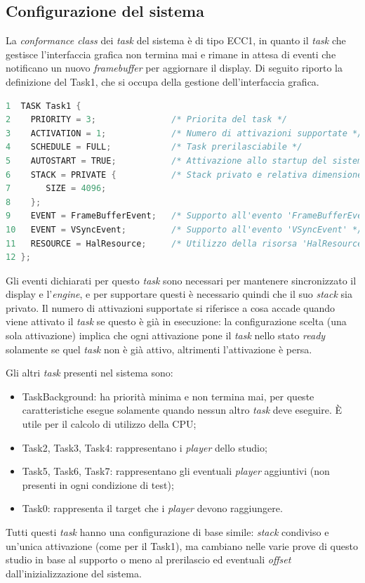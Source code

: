 \documentclass{article}
\begin{document}
\subsection{Configurazione del sistema}
La \textit{conformance class} dei \textit{task} del sistema è di tipo ECC1, in quanto il \textit{task} che gestisce l'interfaccia grafica non termina mai e rimane in attesa di eventi che notificano un nuovo \textit{framebuffer} per aggiornare il display.
Di seguito riporto la definizione del Task1, che si occupa della gestione dell'interfaccia grafica.
\begin{lstlisting}[language=C]
1  TASK Task1 {
2	 PRIORITY = 3;               /* Priorita del task */
3	 ACTIVATION = 1;             /* Numero di attivazioni supportate */
4	 SCHEDULE = FULL;            /* Task prerilasciabile */
5	 AUTOSTART = TRUE;           /* Attivazione allo startup del sistema */
6	 STACK = PRIVATE {           /* Stack privato e relativa dimensione */
7	 	SIZE = 4096;
8	 };
9	 EVENT = FrameBufferEvent;   /* Supporto all'evento 'FrameBufferEvent' */
10	 EVENT = VSyncEvent;         /* Supporto all'evento 'VSyncEvent' */
11	 RESOURCE = HalResource;     /* Utilizzo della risorsa 'HalResource' */
12 };
\end{lstlisting}
Gli eventi dichiarati per questo \textit{task} sono necessari per mantenere sincronizzato il display e l'\textit{engine}, e per supportare questi è necessario quindi che il suo \textit{stack} sia privato. Il numero di attivazioni supportate si riferisce a cosa accade quando viene attivato il \textit{task} se questo è già in esecuzione: la configurazione scelta (una sola attivazione) implica che ogni attivazione pone il \textit{task} nello stato \textit{ready} solamente se quel \textit{task} non è già attivo, altrimenti l'attivazione è persa.

Gli altri \textit{task} presenti nel sistema sono:
\begin{itemize}
	\item TaskBackground: ha priorità minima e non termina mai, per queste caratteristiche esegue solamente quando nessun altro \textit{task} deve eseguire. È utile per il calcolo di utilizzo della CPU;
	\item Task2, Task3, Task4: rappresentano i \textit{player} dello studio;
	\item Task5, Task6, Task7: rappresentano gli eventuali \textit{player} aggiuntivi (non presenti in ogni condizione di test);
	\item Task0: rappresenta il target che i \textit{player} devono raggiungere.
\end{itemize}
Tutti questi \textit{task} hanno una configurazione di base simile: \textit{stack} condiviso e un'unica attivazione (come per il Task1), ma cambiano nelle varie prove di questo studio in base al supporto o meno al prerilascio ed eventuali \textit{offset} dall'inizializzazione del sistema.
\end{document}
